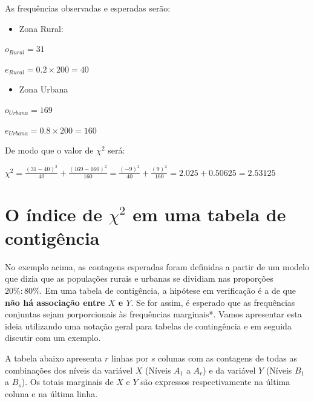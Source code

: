 \documentclass[
]{book}
\providecommand{\tightlist}{%
  \setlength{\itemsep}{0pt}\setlength{\parskip}{0pt}}
\begin{document}
As frequências observadas e esperadas serão:

\begin{itemize}
\tightlist
\item
  Zona Rural:
\end{itemize}

\(o_{Rural} = 31\)

\(e_{Rural} = 0.2 \times 200 = 40\)

\begin{itemize}
\tightlist
\item
  Zona Urbana
\end{itemize}

\(o_{Urbana} = 169\)

\(e_{Urbana} = 0.8 \times 200 = 160\)

De modo que o valor de \(\chi^2\) será:

\(\chi^2 = \frac{(31 - 40)^2}{40} + \frac{(169 - 160)^2}{160} = \frac{(-9)^2}{40} + \frac{(9)^2}{160} = 2.025 + 0.50625 = 2.53125\)

\hypertarget{o-uxedndice-de-chi2-em-uma-tabela-de-contiguxeancia}{%
\section{\texorpdfstring{O índice de \(\chi^2\) em uma tabela de contigência}{O índice de \textbackslash chi\^{}2 em uma tabela de contigência}}\label{o-uxedndice-de-chi2-em-uma-tabela-de-contiguxeancia}}

No exemplo acima, as contagens esperadas foram definidas a partir de um modelo que dizia que as populações rurais e urbanas se dividiam nas proporções \(20\%:80\%\). Em uma tabela de contigência, a hipótese em verificação é a de que \textbf{não há associação entre \(X\) e \(Y\)}. Se for assim, é esperado que as frequências conjuntas sejam \emph{p}orporcionais às frequências marginais*. Vamos apresentar esta ideia utilizando uma notação geral para tabelas de contingência e em seguida discutir com um exemplo.

A tabela abaixo apresenta \(r\) linhas por \(s\) colunas com as contagens de todas as combinações dos níveis da variável \(X\) (Níveis \(A_{1}\) a \(A_{r}\)) e da variável \(Y\) (Níveis \(B_{1}\) a \(B_{s}\)). Os totais marginais de \(X\) e \(Y\) são expressos respectivamente na última coluna e na última linha.
\end{document}
